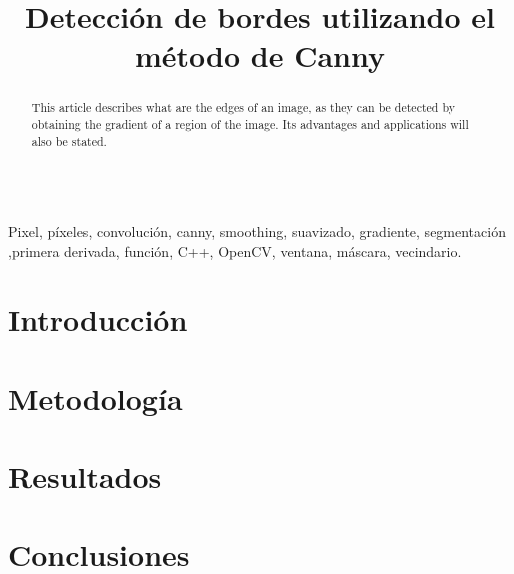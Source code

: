 \documentclass[conference]{IEEEtran}
\begin{document}
\title{ Detecci\'on de bordes utilizando el m\'etodo de Canny }
\author{
}

\maketitle
\renewcommand\abstractname{Abstract}
\begin{abstract}
This article describes what are the edges of an image, as they can be detected by obtaining the gradient of a region of the image. Its advantages and applications will also be stated. \\\\
\end{abstract}

\begin{IEEEkeywords}
Pixel, p\'ixeles, convoluci\'on, canny, smoothing, suavizado, gradiente, segmentaci\'on ,primera derivada, funci\'on, C++, OpenCV, ventana, m\'ascara, vecindario.
\end{IEEEkeywords}

\IEEEpeerreviewmaketitle
\section{Introducci\'on} 


\section{Metodolog\'ia}


\section{Resultados}


\section{Conclusiones}



\end{document}
